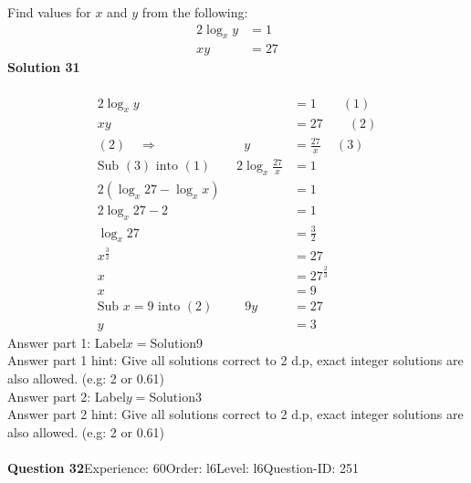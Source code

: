 \documentclass{article}
\begin{document}
Find values for $x$ and $y$ from the following:
\begin{align*}
2\log_{x}y&=1\\[2pt]
xy&=27
\end{align*}
\noindent\textbf{Solution 31}\\[2pt]
\\[-35pt]\begin{align*}
2\log_{x}y&=1\qquad (1)\\[2pt]
xy&=27\qquad (2)\\[2pt]
(2) \quad\Rightarrow\hspace{80pt} y&=\displaystyle\frac{27}{x}\hspace{14pt} (3)\\[2pt]
\text{Sub}\,\,(3)\,\,\text{into}\,\,(1)\qquad 2\log_{x}\displaystyle\frac{27}{x}&=1\\[2pt]
2(\log_{x}27-\log_{x}x)&=1\\[2pt]
2\log_{x}27-2&=1\\[2pt]
\log_{x}27&=\displaystyle\frac{3}{2}\\[2pt]
x^{\frac{3}{2}}&=27\\[2pt]
x&=27^{\frac{2}{3}}\\[2pt]
x&=9\\[12pt]
\text{Sub}\,\,x=9\,\,\text{into}\,\,(2)\hspace{30pt}9y&=27\\[2pt]
y&=3
\end{align*}
Answer part 1: \hspace{10pt}Label\hspace{10pt}$x=$\hspace{10pt}Solution\hspace{10pt}9\\
Answer part 1 hint: \hspace{15pt}Give all solutions correct to 2 d.p, exact integer solutions are also allowed. (e.g: 2 or 0.61)\\
Answer part 2: \hspace{10pt}Label\hspace{10pt}$y=$\hspace{10pt}Solution\hspace{10pt}3\\
Answer part 2 hint: \hspace{15pt}Give all solutions correct to 2 d.p, exact integer solutions are also allowed. (e.g: 2 or 0.61)\\
\\[4pt]
\noindent\textbf{Question 32}\hspace{20pt}Experience: 60\hspace{20pt}Order: l6\hspace{20pt}Level: l6\hspace{20pt}Question-ID: 251\\[2pt]
\end{document}
